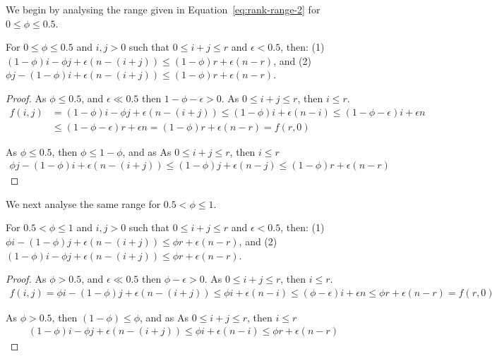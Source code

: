 We begin by analysing the range given in Equation~\ref{eq:rank-range-2} for $0 \leq \phi \leq 0.5$.

\begin{claim}
    For $0 \leq \phi \leq 0.5$ and $i,j>0$ such that $0 \leq i+j \leq r$ and $\epsilon < 0.5$, then: (1) $(1-\phi)i-\phi j + \epsilon(n-(i+j)) \leq (1-\phi) r + \epsilon(n-r)$,
    and (2) $\phi j - (1-\phi)i + \epsilon(n-(i+j)) \leq (1-\phi) r + \epsilon(n-r)$.
    \label{clm:quantiles-bottom-half}
\end{claim}
\begin{proof}
    As $\phi \leq 0.5$, and $\epsilon \ll 0.5$ then $1-\phi-\epsilon > 0$. As $0 \leq i+j \leq r$, then $i \leq r$.
    \begin{align}
        f(i,j)&=(1-\phi)i-\phi j + \epsilon(n-(i+j)) \leq (1-\phi)i + \epsilon(n-i) \leq (1-\phi-\epsilon)i +\epsilon n \\
        &\leq (1-\phi-\epsilon)r +\epsilon n = (1-\phi)r+\epsilon(n-r) = f(r,0)
    \end{align}

    As $\phi \leq 0.5$, then $\phi \leq 1-\phi$, and as As $0 \leq i+j \leq r$, then $i \leq r$
    \begin{align}
        \phi j - (1-\phi)i + \epsilon(n-(i+j)) \leq (1-\phi )j +\epsilon (n-j)  \leq (1-\phi) r + \epsilon (n-r)
    \end{align}
\end{proof}


We next analyse the same range for $0.5 < \phi \leq 1$.


\begin{claim}
    For $0.5 < \phi \leq 1$ and $i,j>0$ such that $0 \leq i+j \leq r$ and $\epsilon < 0.5$, then: (1) $\phi i - (1-\phi)j + \epsilon(n-(i+j)) \leq \phi r + \epsilon(n-r)$, 
    and (2) $(1-\phi)i - \phi j + \epsilon(n-(i+j)) \leq \phi r + \epsilon(n-r)$.
    \label{clm:quantiles-top-half}
\end{claim}
\begin{proof}
    As $\phi > 0.5$, and $\epsilon \ll 0.5$ then $\phi-\epsilon > 0$. As $0 \leq i+j \leq r$, then $i \leq r$.
    \begin{align}
        f(i,j)=\phi i - (1-\phi)j + \epsilon(n-(i+j)) \leq \phi i +\epsilon (n-i) \leq (\phi - \epsilon)i + \epsilon n \leq \phi r + \epsilon(n-r) = f(r,0)
    \end{align}

    As $\phi > 0.5$, then $(1-\phi) \leq \phi$, and as As $0 \leq i+j \leq r$, then $i \leq r$
    \begin{align}
        (1-\phi)i - \phi j + \epsilon(n-(i+j)) \leq \phi i + \epsilon (n-i) \leq \phi r + \epsilon(n-r)
    \end{align}
\end{proof}

